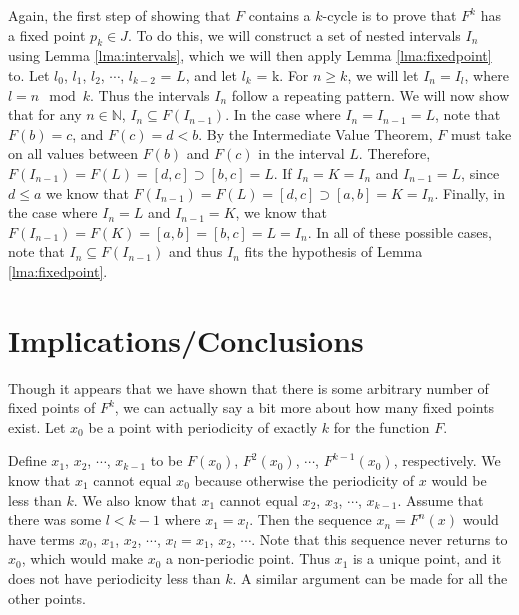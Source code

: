 \documentclass[12pt]{IEEEtran}
\begin{document}

Again, the first step of showing that $F$ contains a $k$-cycle is to prove that $F^k$ has a fixed point $p_k \in J$. To do this, we will construct a set of nested intervals $I_n$  using Lemma \ref{lma:intervals}, which we will then apply Lemma \ref{lma:fixedpoint} to. Let $l_0$, $l_1$, $l_2$, $\cdots$, $l_{k-2}$ = $L$, and let $l_k$ = k. For $n \geq k$, we will let $I_n = I_l$, where $l = n \mod k$. Thus the intervals $I_n$ follow a repeating pattern. We will now show that for any $n \in \mathbb{N}$, $I_n \subseteq F \left( I_{n-1} \right)$. In the case where $I_n = I_{n-1} = L$, note that $F \left( b \right) = c$, and $F \left( c \right) = d < b$. By the Intermediate Value Theorem, $F$ must take on all values between $F \left( b \right)$ and $F \left( c \right)$ in the interval $L$. Therefore, $F \left( I_{n-1} \right) = F \left( L \right) = [d, c] \supset \left[ b,c \right] = L$. If $I_n = K = I_n$ and $I_{n-1} = L$, since $d \leq a$ we know that $F \left( I_{n-1} \right) = F \left( L \right) = [d, c] \supset \left[ a,b \right] = K = I_n$. Finally, in the case where $I_n = L$ and $I_{n-1} = K$, we know that $F \left( I_{n-1} \right) = F \left( K \right) = [a, b] = \left[ b,c \right] = L = I_n$. In all of these possible cases, note that $I_n \subseteq F \left( I_{n-1} \right)$ and thus $I_n$ fits the hypothesis of Lemma \ref{lma:fixedpoint}.
 


\section{Implications/Conclusions}

Though it appears that we have shown that there is some arbitrary number of fixed points of $F^k$, we can actually say a bit more about how many fixed points exist. Let $x_0$ be a point with periodicity of exactly $k$ for the function $F$.

Define $x_1$, $x_2$, $\cdots$, $x_{k-1}$ to be $F \left( x_0 \right)$, $F^2 \left( x_0 \right)$, $\cdots$, $F^{k-1} \left( x_0 \right)$, respectively. We know that $x_1$ cannot equal $x_0$ because otherwise the periodicity of $x$ would be less than $k$. We also know that $x_1$  cannot equal $x_2$, $x_3$, $\cdots$, $x_{k-1}$. Assume that there was some $l < k-1$ where $x_1 = x_l$. Then the sequence $x_n = F^n \left( x \right)$ would have terms $x_0$, $x_1$, $x_2$, $\cdots$, $x_l = x_1$, $x_2$, $\cdots$. Note that this sequence never returns to $x_0$, which would make $x_0$ a non-periodic point. Thus $x_1$ is a unique point, and it does not have periodicity less than $k$. A similar argument can be made for all the other points.
\end{document}
